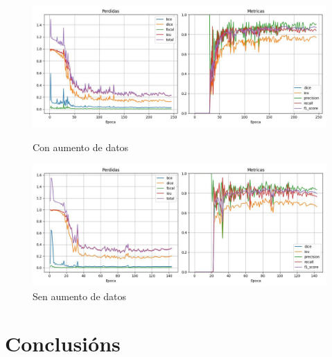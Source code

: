 \documentclass{article}
\begin{document}
\begin{itemize}
\begin{figure}[htbp]
    \centering
    \begin{minipage}{0.45\textwidth}
    \centering
        \includegraphics[width=\linewidth]{figuras/ADT.jpg}
        \caption*{Con aumento de datos}
    \end{minipage}
    \hfill
    \begin{minipage}{0.45\textwidth}
    \centering
        \includegraphics[width=\linewidth]{figuras/ADF.jpg}
        \caption*{Sen aumento de datos}
    \end{minipage}
\end{figure}

\end{itemize}

\section{Conclusións}
\end{document}
